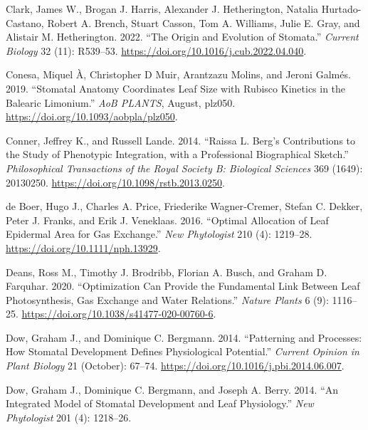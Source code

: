 \documentclass[
  12pt,
]{article}
\newlength{\cslhangindent}
\newlength{\cslentryspacingunit} %
\newenvironment{CSLReferences}[2] %
 {%
  \setlength{\parindent}{0pt}
  \ifodd #1
  \let\oldpar\par
  \def\par{\hangindent=\cslhangindent\oldpar}
  \fi
  \setlength{\parskip}{#2\cslentryspacingunit}
 }%
 {}
\begin{document}
\begin{CSLReferences}{1}{0}
\leavevmode{}%
Clark, James W., Brogan J. Harris, Alexander J. Hetherington, Natalia Hurtado-Castano, Robert A. Brench, Stuart Casson, Tom A. Williams, Julie E. Gray, and Alistair M. Hetherington. 2022. {``The Origin and Evolution of Stomata.''} \emph{Current Biology} 32 (11): R539--53. \url{https://doi.org/10.1016/j.cub.2022.04.040}.

\leavevmode{}%
Conesa, Miquel À, Christopher D Muir, Arantzazu Molins, and Jeroni Galmés. 2019. {``Stomatal Anatomy Coordinates Leaf Size with {Rubisco} Kinetics in the {Balearic} {Limonium}.''} \emph{AoB PLANTS}, August, plz050. \url{https://doi.org/10.1093/aobpla/plz050}.

\leavevmode{}%
Conner, Jeffrey K., and Russell Lande. 2014. {``Raissa {L}. {Berg}'s Contributions to the Study of Phenotypic Integration, with a Professional Biographical Sketch.''} \emph{Philosophical Transactions of the Royal Society B: Biological Sciences} 369 (1649): 20130250. \url{https://doi.org/10.1098/rstb.2013.0250}.

\leavevmode{}%
de Boer, Hugo J., Charles A. Price, Friederike Wagner‐Cremer, Stefan C. Dekker, Peter J. Franks, and Erik J. Veneklaas. 2016. {``Optimal Allocation of Leaf Epidermal Area for Gas Exchange.''} \emph{New Phytologist} 210 (4): 1219--28. \url{https://doi.org/10.1111/nph.13929}.

\leavevmode{}%
Deans, Ross M., Timothy J. Brodribb, Florian A. Busch, and Graham D. Farquhar. 2020. {``Optimization Can Provide the Fundamental Link Between Leaf Photosynthesis, Gas Exchange and Water Relations.''} \emph{Nature Plants} 6 (9): 1116--25. \url{https://doi.org/10.1038/s41477-020-00760-6}.

\leavevmode{}%
Dow, Graham J., and Dominique C. Bergmann. 2014. {``Patterning and Processes: How Stomatal Development Defines Physiological Potential.''} \emph{Current Opinion in Plant Biology} 21 (October): 67--74. \url{https://doi.org/10.1016/j.pbi.2014.06.007}.

\leavevmode{}%
Dow, Graham J., Dominique C. Bergmann, and Joseph A. Berry. 2014. {``An Integrated Model of Stomatal Development and Leaf Physiology.''} \emph{New Phytologist} 201 (4): 1218--26.


\end{CSLReferences}
\end{document}
